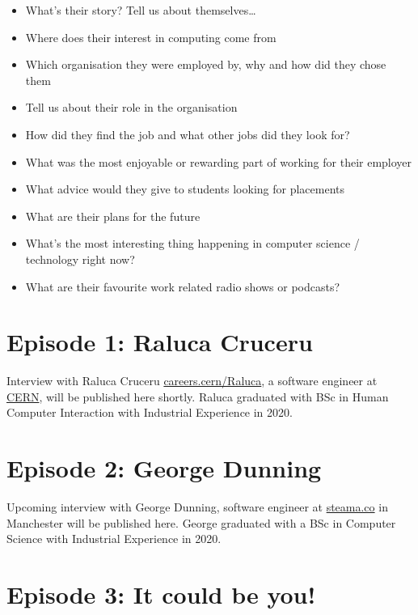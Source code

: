 \documentclass[
]{book}
\providecommand{\tightlist}{%
  \setlength{\itemsep}{0pt}\setlength{\parskip}{0pt}}
\begin{document}
\begin{itemize}
\tightlist
\item
  What's their story? Tell us about themselves\ldots{}
\item
  Where does their interest in computing come from
\item
  Which organisation they were employed by, why and how did they chose them
\item
  Tell us about their role in the organisation
\item
  How did they find the job and what other jobs did they look for?
\item
  What was the most enjoyable or rewarding part of working for their employer
\item
  What advice would they give to students looking for placements
\item
  What are their plans for the future
\item
  What's the most interesting thing happening in computer science / technology right now?
\item
  What are their favourite work related radio shows or podcasts?
\end{itemize}

\hypertarget{episode-1-raluca-cruceru}{%
\section{Episode 1: Raluca Cruceru}\label{episode-1-raluca-cruceru}}

Interview with Raluca Cruceru \href{https://careers.cern/Raluca}{careers.cern/Raluca}, a software engineer at \href{https://home.cern/}{CERN}, will be published here shortly. Raluca graduated with BSc in Human Computer Interaction with Industrial Experience in 2020.

\hypertarget{episode-2-george-dunning}{%
\section{Episode 2: George Dunning}\label{episode-2-george-dunning}}

Upcoming interview with George Dunning, software engineer at \href{https://steama.co/}{steama.co} in Manchester will be published here. George graduated with a BSc in Computer Science with Industrial Experience in 2020.

\hypertarget{episode-3-it-could-be-you}{%
\section{Episode 3: It could be you!}\label{episode-3-it-could-be-you}}
\end{document}
